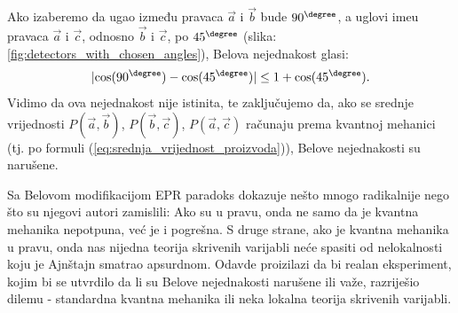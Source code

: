 \label{fig:detectors_with_chosen_angles}

Ako izaberemo da ugao između pravaca $\vec{a}$ i $\vec{b}$ bude $90^\degree$, a uglovi ime\dj u pravaca $\vec{a}$ i $\vec{c}$, odnosno $\vec{b}$ i $\vec{c}$, po $45^\degree$ (slika: \ref{fig:detectors_with_chosen_angles}), Belova nejednakost glasi:
\begin{equation*}
    | \mathrm{cos}(90^\degree) - \mathrm{cos}(45^\degree)|\le 1 + \mathrm{cos}(45^\degree).
\end{equation*}
Vidimo da ova nejednakost nije istinita, te zaključujemo da, ako se srednje vrijednosti $P(\vec{a},\vec{b})$, $P(\vec{b},\vec{c})$, $P(\vec{a},\vec{c})$ računaju prema kvantnoj mehanici (tj. po formuli (\ref{eq:srednja_vrijednost_proizvoda})), Belove nejednakosti su narušene.

Sa Belovom modifikacijom EPR paradoks dokazuje nešto mnogo radikalnije nego što su njegovi autori zamislili:
Ako su u pravu, onda ne samo da je kvantna mehanika nepotpuna, već je i pogrešna.
S druge strane, ako je kvantna mehanika u pravu, onda nas nijedna teorija skrivenih varijabli neće spasiti od nelokalnosti koju je Ajnštajn smatrao apsurdnom.
Odavde proizilazi da bi realan eksperiment, kojim bi se utvrdilo da li su Belove nejednakosti narušene ili važe, razriješio dilemu - standardna kvantna mehanika ili neka lokalna teorija skrivenih varijabli.
